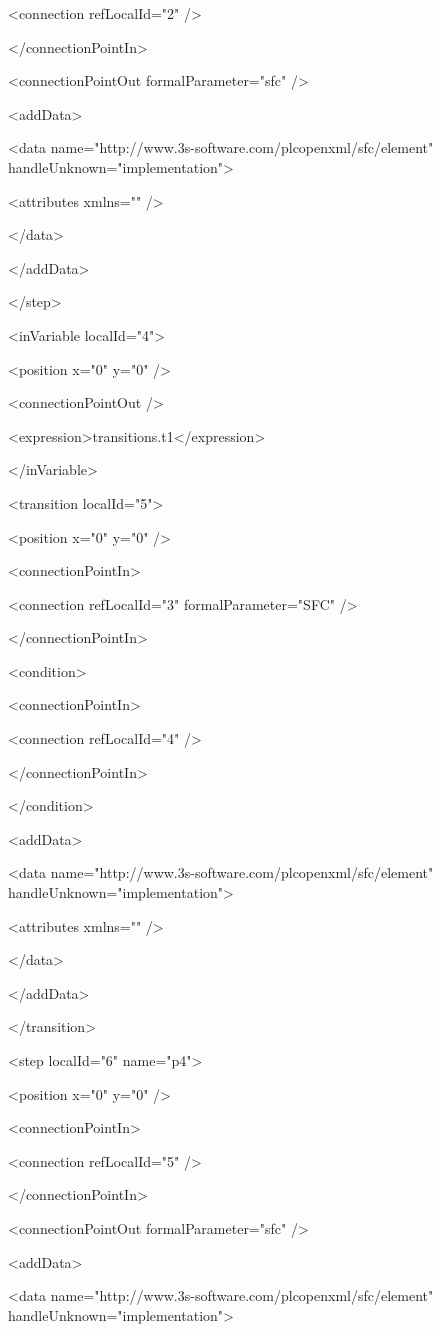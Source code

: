    <connection refLocalId="2" />

  </connectionPointIn>

  <connectionPointOut formalParameter="sfc" />

  <addData>

   <data name="http://www.3s-software.com/plcopenxml/sfc/element" handleUnknown="implementation">

    <attributes xmlns="" />

   </data>

  </addData>

 </step>

 <inVariable localId="4">

  <position x="0" y="0" />

  <connectionPointOut />

  <expression>transitions.t1</expression>

 </inVariable>

 <transition localId="5">

  <position x="0" y="0" />

  <connectionPointIn>

   <connection refLocalId="3" formalParameter="SFC" />

  </connectionPointIn>

  <condition>

   <connectionPointIn>

    <connection refLocalId="4" />

   </connectionPointIn>

  </condition>

  <addData>

   <data name="http://www.3s-software.com/plcopenxml/sfc/element" handleUnknown="implementation">

    <attributes xmlns="" />

   </data>

  </addData>

 </transition>

 <step localId="6" name="p4">

  <position x="0" y="0" />

  <connectionPointIn>

   <connection refLocalId="5" />

  </connectionPointIn>

  <connectionPointOut formalParameter="sfc" />

  <addData>

   <data name="http://www.3s-software.com/plcopenxml/sfc/element" handleUnknown="implementation">

